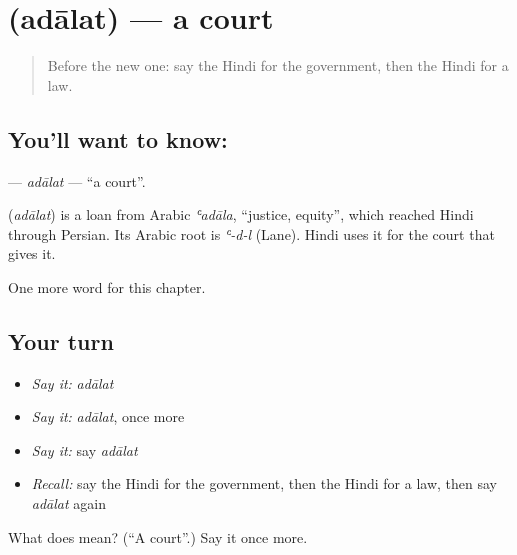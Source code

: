 \section[\texorpdfstring{\hi{अदालत} (adālat)}{अदालत (adālat)}]{ (adālat) — a court}

\label{lesson:HI-C218-adalat}



\begin{quote}
Before the new one: say the Hindi for the government, then the Hindi for a law.
\end{quote}

\subsection*{You'll want to know: }
\textbf{} — \emph{adālat} — \textquotedblleft{}a court\textquotedblright{}.

\begin{cousinweb}
\textbf{} (\emph{adālat}) is a loan from Arabic \emph{ʿadāla}, \textquotedblleft{}justice, equity\textquotedblright{}, which reached Hindi through Persian. Its Arabic root is \emph{ʿ-d-l} (Lane). Hindi uses it for the court that gives it.
\end{cousinweb}

\begin{grammarlens}[title={What you've built}]
One more word for this chapter.
\end{grammarlens}

\subsection*{Your turn}
\begin{itemize}
\raggedright
  \item \emph{Say it:} \emph{adālat}
  \item \emph{Say it:} \emph{adālat}, once more
  \item \emph{Say it:} say \emph{adālat}
  \item \emph{Recall:} say the Hindi for the government, then the Hindi for a law, then say \emph{adālat} again
\end{itemize}

\begin{tcolorbox}[breakable,colback=teal!4,colframe=teal!35!black,title={Before you move on}]
What does  mean? (\textquotedblleft{}A court\textquotedblright{}.) Say it once more.
\end{tcolorbox}
